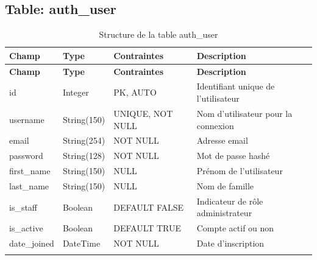 \documentclass[12pt,a4paper]{report}
\begin{document}
\subsection{Table: auth\_user}
\begin{longtable}{|p{3.5cm}|p{2.5cm}|p{2cm}|p{6cm}|}
\hline
\rowcolor{banquiseblue!30}
\textbf{Champ} & \textbf{Type} & \textbf{Contraintes} & \textbf{Description} \\
\hline
\endfirsthead
\hline
\rowcolor{banquiseblue!30}
\textbf{Champ} & \textbf{Type} & \textbf{Contraintes} & \textbf{Description} \\
\hline
\endhead

id & Integer & PK, AUTO & Identifiant unique de l'utilisateur \\
\hline
username & String(150) & UNIQUE, NOT NULL & Nom d'utilisateur pour la connexion \\
\hline
email & String(254) & NOT NULL & Adresse email \\
\hline
password & String(128) & NOT NULL & Mot de passe hashé \\
\hline
first\_name & String(150) & NULL & Prénom de l'utilisateur \\
\hline
last\_name & String(150) & NULL & Nom de famille \\
\hline
is\_staff & Boolean & DEFAULT FALSE & Indicateur de rôle administrateur \\
\hline
is\_active & Boolean & DEFAULT TRUE & Compte actif ou non \\
\hline
date\_joined & DateTime & NOT NULL & Date d'inscription \\
\hline

\caption{Structure de la table auth\_user}
\end{longtable}
\end{document}
